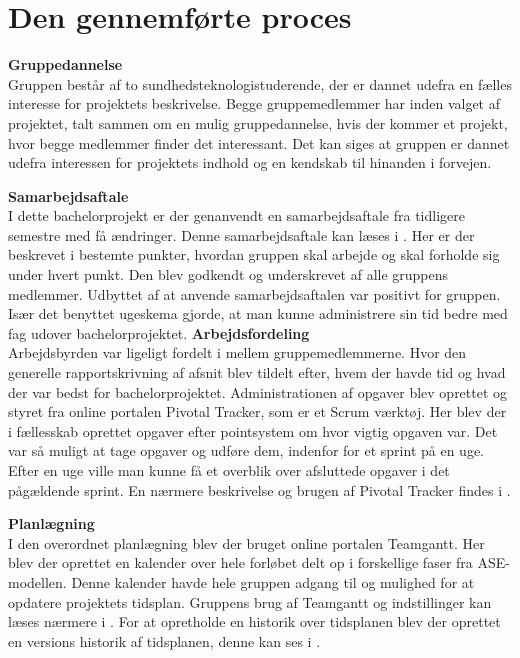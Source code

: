 \section{Den gennemførte proces}


\textbf{Gruppedannelse}\\
Gruppen består af to sundhedsteknologistuderende, der er dannet udefra en fælles interesse for projektets beskrivelse. Begge gruppemedlemmer har inden valget af projektet, talt sammen om en mulig gruppedannelse, hvis der kommer et projekt, hvor begge medlemmer finder det interessant. Det kan siges at gruppen er dannet udefra interessen for projektets indhold og en kendskab til hinanden i forvejen. 

\textbf{Samarbejdsaftale}\\
I dette bachelorprojekt er der genanvendt en samarbejdsaftale fra tidligere semestre med få ændringer. Denne samarbejdsaftale kan læses i . Her er der beskrevet i bestemte punkter, hvordan gruppen skal arbejde og skal forholde sig under hvert punkt. Den blev godkendt og underskrevet af alle gruppens medlemmer. Udbyttet af at anvende samarbejdsaftalen var positivt for gruppen. Især det benyttet ugeskema gjorde, at man kunne administrere sin tid bedre med fag udover bachelorprojektet. 
\pagebreak
\textbf{Arbejdsfordeling}\\
Arbejdsbyrden var ligeligt fordelt i mellem gruppemedlemmerne. Hvor den generelle rapportskrivning af afsnit blev tildelt efter, hvem der havde tid og hvad der var bedst for bachelorprojektet. Administrationen af opgaver blev oprettet og styret fra online portalen Pivotal Tracker, som er et Scrum værktøj. Her blev der i fællesskab oprettet opgaver efter pointsystem om hvor vigtig opgaven var. Det var så muligt at tage opgaver og udføre dem, indenfor for et sprint på en uge. Efter en uge ville man kunne få et overblik over afsluttede opgaver i det pågældende sprint. En nærmere beskrivelse og brugen af Pivotal Tracker findes i .

\textbf{Planlægning}\\
I den overordnet planlægning blev der bruget online portalen Teamgantt. Her blev der oprettet en kalender over hele forløbet delt op i forskellige faser fra ASE-modellen. Denne kalender havde hele gruppen adgang til og mulighed for at opdatere projektets tidsplan. Gruppens brug af Teamgantt og indstillinger kan læses nærmere i . For at opretholde en historik over tidsplanen blev der oprettet en versions historik af tidsplanen, denne kan ses i .

